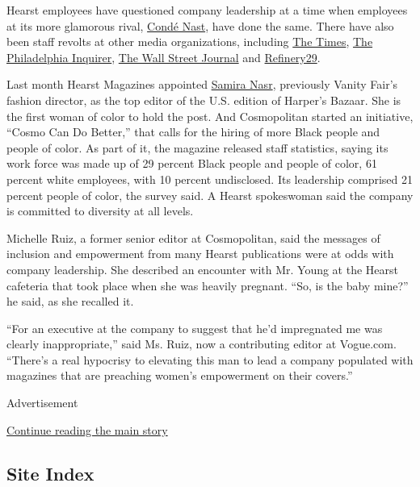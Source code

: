 Hearst employees have questioned company leadership at a time when
employees at its more glamorous rival,
\href{https://www.nytimes3xbfgragh.onion/2020/06/13/business/media/conde-nast-racial.html}{Condé
Nast}, have done the same. There have also been staff revolts at other
media organizations, including
\href{https://www.nytimes3xbfgragh.onion/2020/06/07/business/media/james-bennet-resigns-nytimes-op-ed.html}{The
Times},
\href{https://www.nytimes3xbfgragh.onion/2020/06/06/business/media/editor-philadephia-inquirer-resigns.html}{The
Philadelphia Inquirer},
\href{https://www.nytimes3xbfgragh.onion/2020/07/10/business/media/wall-street-journal-staff.html}{The
Wall Street Journal} and
\href{https://www.nytimes3xbfgragh.onion/2020/06/08/business/media/refinery-29-christene-barberich.html}{Refinery29}.

Last month Hearst Magazines appointed
\href{https://www.nytimes3xbfgragh.onion/2020/06/09/business/media/harpers-bazaar-editor-samira-nasr.html}{Samira
Nasr}, previously Vanity Fair's fashion director, as the top editor of
the U.S. edition of Harper's Bazaar. She is the first woman of color to
hold the post. And Cosmopolitan started an initiative, ``Cosmo Can Do
Better,'' that calls for the hiring of more Black people and people of
color. As part of it, the magazine released staff statistics, saying its
work force was made up of 29 percent Black people and people of color,
61 percent white employees, with 10 percent undisclosed. Its leadership
comprised 21 percent people of color, the survey said. A Hearst
spokeswoman said the company is committed to diversity at all levels.

Michelle Ruiz, a former senior editor at Cosmopolitan, said the messages
of inclusion and empowerment from many Hearst publications were at odds
with company leadership. She described an encounter with Mr. Young at
the Hearst cafeteria that took place when she was heavily pregnant.
``So, is the baby mine?'' he said, as she recalled it.

``For an executive at the company to suggest that he'd impregnated me
was clearly inappropriate,'' said Ms. Ruiz, now a contributing editor at
Vogue.com. ``There's a real hypocrisy to elevating this man to lead a
company populated with magazines that are preaching women's empowerment
on their covers.''

Advertisement

\protect\hyperlink{after-bottom}{Continue reading the main story}

\hypertarget{site-index}{%
\subsection{Site Index}\label{site-index}}

